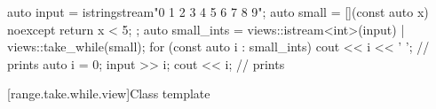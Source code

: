 \pnum
\begin{example}
\begin{codeblock}
auto input = istringstream{"0 1 2 3 4 5 6 7 8 9"};
auto small = [](const auto x) noexcept { return x < 5; };
auto small_ints = views::istream<int>(input) | views::take_while(small);
for (const auto i : small_ints) {
  cout << i << ' ';                             // prints 
}
auto i = 0;
input >> i;
cout << i;                                      // prints 
\end{codeblock}
\end{example}

[range.take.while.view]{Class template }

%
%
%
%
